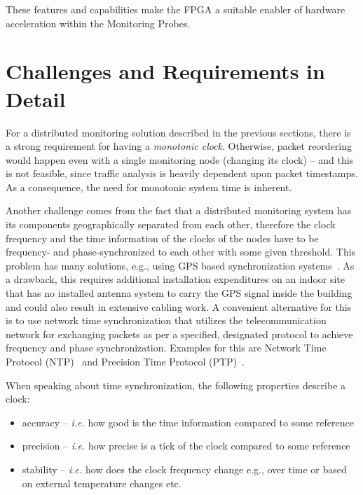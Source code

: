\documentclass[journal]{IEEEtran}
\begin{document}
These features and capabilities make the FPGA a suitable enabler of hardware acceleration within the Monitoring Probes.

\section{Challenges and Requirements in Detail}\label{sec:Challanges}


For a distributed monitoring solution described in the previous sections, there is a strong requirement for having
a \emph{monotonic clock}. Otherwise, packet reordering would happen even with a single monitoring node (changing its clock) -- and this is not feasible, since traffic analysis is heavily dependent upon packet timestamps. As a consequence, the need for monotonic system time is inherent.

Another challenge comes from the fact that a distributed monitoring system has its components geographically
separated from each other, therefore the clock frequency and the time information of the clocks of the nodes have to be
frequency- and phase-synchronized to each other with some given threshold. This problem has many solutions, e.g., using
GPS based synchronization
systems~\cite{GPS-CLOCK}. As a drawback, this requires additional installation expenditures on an indoor site that has no installed
antenna system to carry the GPS signal inside the building and could also result in extensive cabling work.
A convenient alternative for this is to use network time synchronization that utilizes the telecommunication network for
exchanging packets as per a specified, designated protocol to achieve frequency and phase synchronization. Examples for this
are Network Time Protocol (NTP)~\cite{NTP} and Precision Time Protocol (PTP)~\cite{PTP}.

When speaking about time synchronization, the following properties describe a clock:
\begin{itemize}
    \item accuracy -- \emph{i.e.} how good is the time information compared to some reference
    \item precision -- \emph{i.e.} how precise is a tick of the clock compared to some reference
    \item stability -- \emph{i.e.} how does the clock frequency change	e.g., over time or based on external
          temperature changes etc.
\end{itemize}
\end{document}
